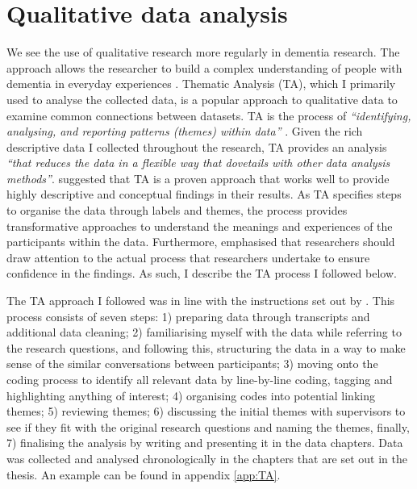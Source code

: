 \section{Qualitative data analysis}
\label{QualDataAnalysis}
We see the use of qualitative research more regularly in dementia research. The approach allows the researcher to build a complex understanding of people with dementia in everyday experiences \citep{mckeown_actively_2009}. Thematic Analysis (TA), which I primarily used to analyse the collected data, is a popular approach to qualitative data to examine common connections between datasets. TA is the process of \textit{``identifying, analysing, and reporting patterns (themes) within data''} \citep{braun_using_2006}. Given the rich descriptive data I collected throughout the research, TA provides an analysis \textit{``that reduces the data in a flexible way that dovetails with other data analysis methods''}. \cite{kiger2020thematic} suggested that TA is a proven approach that works well to provide highly descriptive and conceptual findings in their results. As TA specifies steps to organise the data through labels and themes, the process provides transformative approaches to understand the meanings and experiences of the participants within the data. Furthermore, \cite{braun2012thematic} emphasised that researchers should draw attention to the actual process that researchers undertake to ensure confidence in the findings. As such, I describe the TA process I followed below.

The TA approach I followed was in line with the instructions set out by \cite{braun_one_2020}. This process consists of seven steps: 1) preparing data through transcripts and additional data cleaning; 2) familiarising myself with the data while referring to the research questions, and following this, structuring the data in a way to make sense of the similar conversations between participants; 3) moving onto the coding process to identify all relevant data by line-by-line coding, tagging and highlighting anything of interest; 4) organising codes into potential linking themes; 5) reviewing themes; 6) discussing the initial themes with supervisors to see if they fit with the original research questions and naming the themes, finally, 7) finalising the analysis by writing and presenting it in the data chapters. Data was collected and analysed chronologically in the chapters that are set out in the thesis. An example can be found in appendix \ref{app:TA}.


